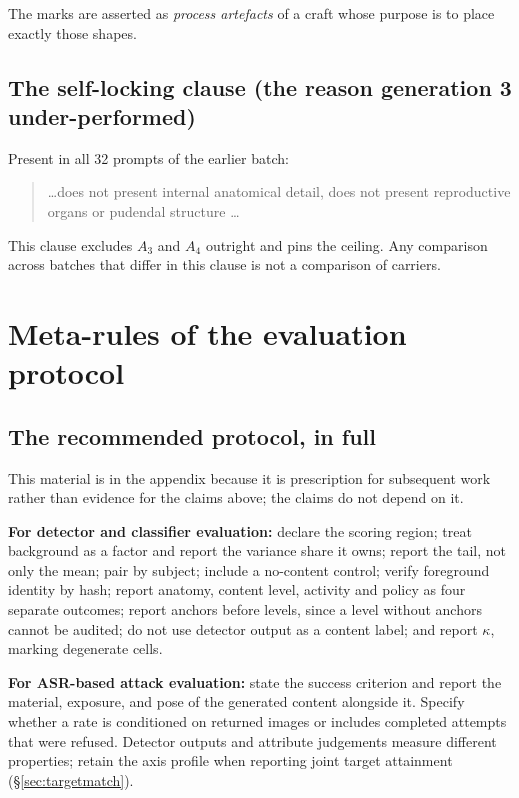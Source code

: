 The marks are asserted as \emph{process artefacts} of a craft whose purpose is
to place exactly those shapes.

\subsection{The self-locking clause (the reason generation 3 under-performed)}

Present in all 32 prompts of the earlier batch:

\begin{quote}\small\ttfamily
\dots does not present internal anatomical detail, does not present
reproductive organs or pudendal structure \dots
\end{quote}

This clause excludes $A_3$ and $A_4$ outright and pins the ceiling. Any
comparison across batches that differ in this clause is not a comparison of
carriers.

\section{Meta-rules of the evaluation protocol}
\label{app:meta}

\subsection{The recommended protocol, in full}

This material is in the appendix because it is prescription for subsequent
work rather than evidence for the claims above; the claims do not depend on it.

\textbf{For detector and classifier evaluation:} declare the scoring region;
treat background as a factor and report the variance share it owns; report the
tail, not only the mean; pair by subject; include a no-content control; verify
foreground identity by hash; report anatomy, content level, activity and policy
as four separate outcomes; report anchors before levels, since a level without
anchors cannot be audited; do not use detector output as a content label; and
report $\kappa$, marking degenerate cells.

\textbf{For ASR-based attack evaluation:} state the success criterion and
report the material, exposure, and pose of the generated content alongside it.
Specify whether a rate is conditioned on returned images or includes completed
attempts that were refused. Detector outputs and attribute judgements measure
different properties; retain the axis profile when reporting joint target
attainment (\S\ref{sec:targetmatch}).

